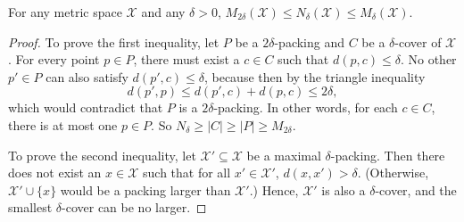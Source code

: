 \documentclass[../main.tex]{subfiles}
\newcommand{\set}[1]{\mathcal {#1}}
\newcommand{\dist}[2]{\distf({#1},{#2})}
\newcommand{\distf}{d}
\newcommand{\minkdim}{\text{dim}_\textnormal{Mink}}
\begin{document}
\begin{lemma}
    \label{lemma:coverpacking}
    For any metric space $\set X$ and any $\delta>0$,
    $M_{2\delta}(\set X) \le N_\delta(\set X) \le M_{\delta}(\set X)$.
\end{lemma}

\begin{proof}
    To prove the first inequality, let $P$ be a $2\delta$-packing and $C$ be a $\delta$-cover of $\set X$.
    For every point $p\in P$, there must exist a $c\in C$ such that $\dist{p}{c}\le\delta$.
    No other $p'\in P$ can also satisfy $\dist{p'}{c}\le\delta$, because then by the triangle inequality
    \begin{equation}
        \dist{p'}{p} \le \dist{p'}{c}+\dist{p}{c} \le 2\delta
        ,
    \end{equation}
    which would contradict that $P$ is a $2\delta$-packing.
    In other words, for each $c\in C$, there is at most one $p\in P$.
    So $N_\delta \ge |C| \ge |P| \ge M_{2\delta}$.

    To prove the second inequality, let $\set X'\subseteq \set X$ be a maximal $\delta$-packing.
    Then there does not exist an $x\in\set X$ such that for all $x'\in\set X'$, 
    $\dist{x}{x'} > \delta$.
    (Otherwise, $\set X' \cup \{x\}$ would be a packing larger than $\set X'$.)
    Hence, $\set X'$ is also a $\delta$-cover,
    and the smallest $\delta$-cover can be no larger.
\end{proof}

%

%
\end{document}
